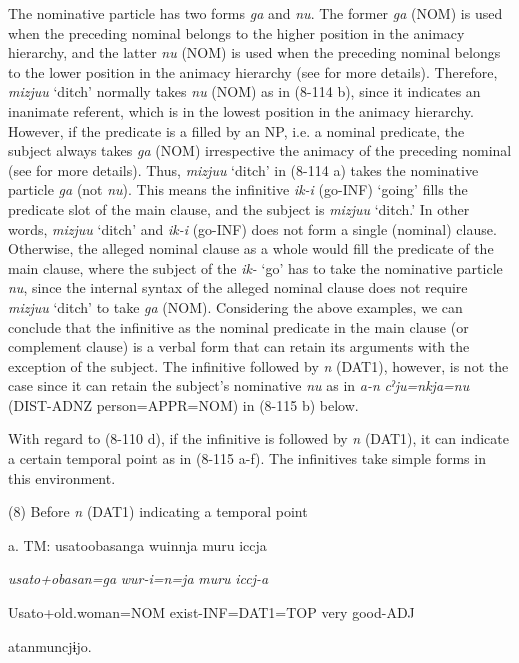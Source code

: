 The nominative particle has two forms \textit{ga} and \textit{nu}. The former \textit{ga} (NOM) is used when the preceding nominal belongs to the higher position in the animacy hierarchy, and the latter \textit{nu} (NOM) is used when the preceding nominal belongs to the lower position in the animacy hierarchy (see  for more details). Therefore, \textit{mizjuu} ‘ditch’ normally takes \textit{nu} (NOM) as in (8-114 b), since it indicates an inanimate referent, which is in the lowest position in the animacy hierarchy. However, if the predicate is a filled by an NP, i.e. a nominal predicate, the subject always takes \textit{ga} (NOM) irrespective the animacy of the preceding nominal (see  for more details). Thus, \textit{mizjuu} ‘ditch’ in (8-114 a) takes the nominative particle \textit{ga} (not \textit{nu}). This means the infinitive \textit{ik-i} (go-INF) ‘going’ fills the predicate slot of the main clause, and the subject is \textit{mizjuu} ‘ditch.’ In other words, \textit{mizjuu} ‘ditch’ and \textit{ik-i} (go-INF) does not form a single (nominal) clause. Otherwise, the alleged nominal clause as a whole would fill the predicate of the main clause, where the subject of the \textit{ik-} ‘go’ has to take the nominative particle \textit{nu}, since the internal syntax of the alleged nominal clause does not require \textit{mizjuu} ‘ditch’ to take \textit{ga} (NOM). Considering the above examples, we can conclude that the infinitive as the nominal predicate in the main clause (or complement clause) is a verbal form that can retain its arguments with the exception of the subject. The infinitive followed by \textit{n} (DAT1), however, is not the case since it can retain the subject’s nominative \textit{nu} as in \textit{a-n} \textit{cˀju=nkja=nu} (DIST-ADNZ person=APPR=NOM) in (8-115 b) below.

  With regard to (8-110 d), if the infinitive is followed by \textit{n} (DAT1), it can indicate a certain temporal point as in (8-115 a-f). The infinitives take simple forms in this environment.

(8)  Before \textit{n} (DAT1) indicating a temporal point

  a.  TM:  usatoobasanga  wuinnja  muru  iccja

      \textit{usato+obasan=ga}  \textit{wur-i=n=ja}  \textit{muru}  \textit{iccj-a}

      Usato+old.woman=NOM  exist-INF=DAT1=TOP  very  good-ADJ

      atanmuncjɨjo.

